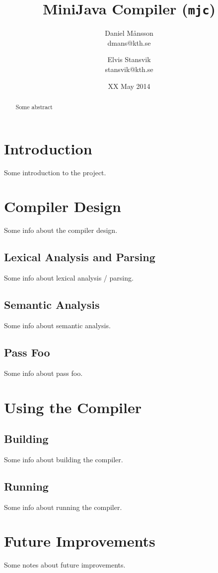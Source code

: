 \documentclass[a4paper]{article}
\title{MiniJava Compiler (\texttt{mjc})}
\date{XX May 2014}
\author{
    Daniel Månsson\\
    dmans@kth.se
    \and
    Elvis Stansvik\\
    stansvik@kth.se
}
\begin{document}
\maketitle

\begin{abstract}
Some abstract
\end{abstract}

\tableofcontents

\section{Introduction}
Some introduction to the project. \cite{grammar}

\section{Compiler Design}
Some info about the compiler design.

\subsection{Lexical Analysis and Parsing}
Some info about lexical analysis / parsing.

\subsection{Semantic Analysis}
Some info about semantic analysis.

\subsection{Pass Foo}
Some info about pass foo.

\section{Using the Compiler}

\subsection{Building}
Some info about building the compiler.

\subsection{Running}
Some info about running the compiler.

\section{Future Improvements}
Some notes about future improvements.

\printbibliography
\end{document}

